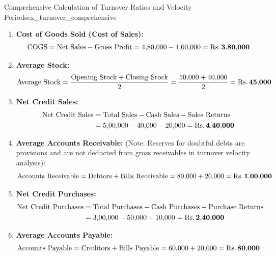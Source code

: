 \begin{example}{Comprehensive Calculation of Turnover Ratios and Velocity Periods}{ex_turnover_comprehensive}
\begin{enumerate}[leftmargin=*]
    \item \textbf{Cost of Goods Sold (Cost of Sales):}
    \begin{equation*}
        \operatorname{COGS} = \text{Net Sales} - \text{Gross Profit} = 4{,}80{,}000 - 1{,}00{,}000 = \mathbf{\text{Rs.}\, 3{,}80{,}000}
    \end{equation*}

    \item \textbf{Average Stock:}
    \begin{equation*}
        \text{Average Stock} = \frac{\text{Opening Stock} + \text{Closing Stock}}{2} = \frac{50{,}000 + 40{,}000}{2} = \mathbf{\text{Rs.}\, 45{,}000}
    \end{equation*}

    \item \textbf{Net Credit Sales:}
    \begin{align*}
        \text{Net Credit Sales} &= \text{Total Sales} - \text{Cash Sales} - \text{Sales Returns} \\
                                &= 5{,}00{,}000 - 40{,}000 - 20{,}000 = \mathbf{\text{Rs.}\, 4{,}40{,}000}
    \end{align*}

    \item \textbf{Average Accounts Receivable:}
    (Note: Reserves for doubtful debts are provisions and are not deducted from gross receivables in turnover velocity analysis):
    \begin{equation*}
        \text{Accounts Receivable} = \text{Debtors} + \text{Bills Receivable} = 80{,}000 + 20{,}000 = \mathbf{\text{Rs.}\, 1{,}00{,}000}
    \end{equation*}

    \item \textbf{Net Credit Purchases:}
    \begin{align*}
        \text{Net Credit Purchases} &= \text{Total Purchases} - \text{Cash Purchases} - \text{Purchase Returns} \\
                                    &= 3{,}00{,}000 - 50{,}000 - 10{,}000 = \mathbf{\text{Rs.}\, 2{,}40{,}000}
    \end{align*}

    \item \textbf{Average Accounts Payable:}
    \begin{equation*}
        \text{Accounts Payable} = \text{Creditors} + \text{Bills Payable} = 60{,}000 + 20{,}000 = \mathbf{\text{Rs.}\, 80{,}000}
    \end{equation*}
\end{enumerate}


\end{example}
